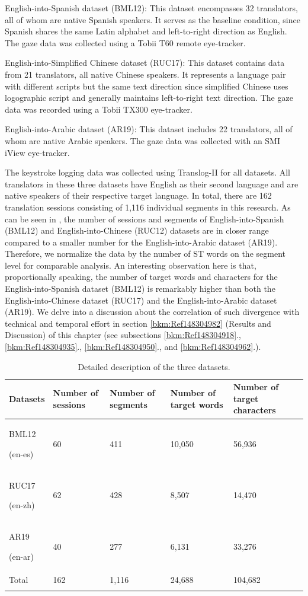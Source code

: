 \documentclass[output=paper]{langscibook}
\begin{document}
English-into-Spanish dataset (BML12): This dataset encompasses 32 translators, all of whom are native Spanish speakers. It serves as the baseline condition, since Spanish shares the same Latin alphabet and left-to-right direction as English. The gaze data was collected using a Tobii T60 remote eye-tracker.

English-into-Simplified Chinese dataset (RUC17): This dataset contains data from 21 translators, all native Chinese speakers. It represents a language pair with different scripts but the same text direction since simplified Chinese uses logographic script and generally maintains left-to-right text direction. The gaze data was recorded using a Tobii TX300 eye-tracker.

English-into-Arabic dataset (AR19): This dataset includes 22 translators, all of whom are native Arabic speakers. The gaze data was collected with an SMI iView eye-tracker.

The keystroke logging data was collected using Translog-II for all datasets. All translators in these three datasets have English as their second language and are native speakers of their respective target language. In total, there are 162 translation sessions consisting of 1,116 individual segments in this research. As can be seen in , the number of sessions and segments of English-into-Spanish (BML12) and English-into-Chinese (RUC12) datasets are in closer range compared to a smaller number for the English-into-Arabic dataset (AR19). Therefore, we normalize the data by the number of ST words on the segment level for comparable analysis. An interesting observation here is that, proportionally speaking, the number of target words and characters for the English-into-Spanish dataset (BML12) is remarkably higher than both the English-into-Chinese dataset (RUC17) and the English-into-Arabic dataset (AR19). We delve into a discussion about the correlation of such divergence with technical and temporal effort in section \ref{bkm:Ref148304982} (Results and Discussion) of this chapter (see subsections \ref{bkm:Ref148304918}., \ref{bkm:Ref148304935}., \ref{bkm:Ref148304950}., and \ref{bkm:Ref148304962}.).

\begin{table}
\begin{tabularx}{\textwidth}{p{1.3cm}YYYY}
\lsptoprule
 {Datasets} & {Number of sessions} & {Number of segments} & {Number of target words} & {Number of target characters}\\
 \midrule
{ {BML12}}

 {(en-es)} & 60 & 411 & 10,050 & 56,936~\\
{ {RUC17}}

 {(en-zh)} & 62 & 428 & 8,507 & 14,470~\\
{ {AR19}}

 {(en-ar)} & 40 & 277 & 6,131 & 33,276~\\
 {Total} & 162 & 1,116 & 24,688 & 104,682~\\
\lspbottomrule
\end{tabularx}
\caption{\label{tab:saedi:2}Detailed description of the three datasets.}
\end{table}
\end{document}
